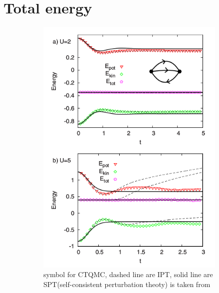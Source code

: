 \section{Total energy}
\begin{figure}[H]
\begin{subfigure}{.5\textwidth}
 \includegraphics[width=1\linewidth]{bench_marking/energy_lit.png}
  \caption{symbol for CTQMC, dashed line are IPT, solid line are SPT(self-consistent perturbation theoty) is taken from \cite{HUB1}}
\end{subfigure}%
\begin{subfigure}{.5\textwidth}

\end{subfigure}
\end{figure}
